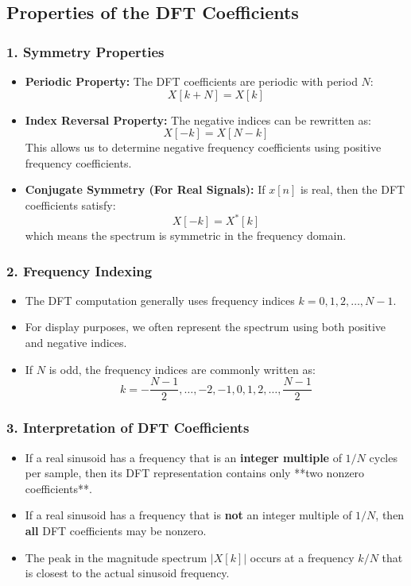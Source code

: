 \documentclass[12pt, letterpaper]{article}
\begin{document}
\subsection{Properties of the DFT Coefficients}

\subsubsection*{1. Symmetry Properties}
\begin{itemize}
    \item \textbf{Periodic Property:} The DFT coefficients are periodic with period \( N \):
    \[
    X[k + N] = X[k]
    \]
    \item \textbf{Index Reversal Property:} The negative indices can be rewritten as:
    \[
    X[-k] = X[N - k]
    \]
    This allows us to determine negative frequency coefficients using positive frequency coefficients.
    \item \textbf{Conjugate Symmetry (For Real Signals):} If \( x[n] \) is real, then the DFT coefficients satisfy:
    \[
    X[-k] = X^*[k]
    \]
    which means the spectrum is symmetric in the frequency domain.
\end{itemize}

\subsubsection*{2. Frequency Indexing}
\begin{itemize}
    \item The DFT computation generally uses frequency indices \( k = 0, 1, 2, \dots, N - 1 \).
    \item For display purposes, we often represent the spectrum using both positive and negative indices.
    \item If \( N \) is odd, the frequency indices are commonly written as:
    \[
    k = -\frac{N-1}{2}, \dots, -2, -1, 0, 1, 2, \dots, \frac{N-1}{2}
    \]
\end{itemize}

\subsubsection*{3. Interpretation of DFT Coefficients}
\begin{itemize}
    \item If a real sinusoid has a frequency that is an \textbf{integer multiple} of \( 1/N \) cycles per sample, then its DFT representation contains only **two nonzero coefficients**.
    \item If a real sinusoid has a frequency that is \textbf{not} an integer multiple of \( 1/N \), then \textbf{all} DFT coefficients may be nonzero.
    \item The peak in the magnitude spectrum \( |X[k]| \) occurs at a frequency \( k/N \) that is closest to the actual sinusoid frequency.
\end{itemize}
\end{document}
